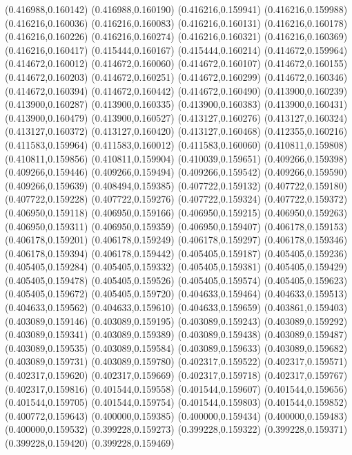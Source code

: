 (0.416988,0.160142)
(0.416988,0.160190)
(0.416216,0.159941)
(0.416216,0.159988)
(0.416216,0.160036)
(0.416216,0.160083)
(0.416216,0.160131)
(0.416216,0.160178)
(0.416216,0.160226)
(0.416216,0.160274)
(0.416216,0.160321)
(0.416216,0.160369)
(0.416216,0.160417)
(0.415444,0.160167)
(0.415444,0.160214)
(0.414672,0.159964)
(0.414672,0.160012)
(0.414672,0.160060)
(0.414672,0.160107)
(0.414672,0.160155)
(0.414672,0.160203)
(0.414672,0.160251)
(0.414672,0.160299)
(0.414672,0.160346)
(0.414672,0.160394)
(0.414672,0.160442)
(0.414672,0.160490)
(0.413900,0.160239)
(0.413900,0.160287)
(0.413900,0.160335)
(0.413900,0.160383)
(0.413900,0.160431)
(0.413900,0.160479)
(0.413900,0.160527)
(0.413127,0.160276)
(0.413127,0.160324)
(0.413127,0.160372)
(0.413127,0.160420)
(0.413127,0.160468)
(0.412355,0.160216)
(0.411583,0.159964)
(0.411583,0.160012)
(0.411583,0.160060)
(0.410811,0.159808)
(0.410811,0.159856)
(0.410811,0.159904)
(0.410039,0.159651)
(0.409266,0.159398)
(0.409266,0.159446)
(0.409266,0.159494)
(0.409266,0.159542)
(0.409266,0.159590)
(0.409266,0.159639)
(0.408494,0.159385)
(0.407722,0.159132)
(0.407722,0.159180)
(0.407722,0.159228)
(0.407722,0.159276)
(0.407722,0.159324)
(0.407722,0.159372)
(0.406950,0.159118)
(0.406950,0.159166)
(0.406950,0.159215)
(0.406950,0.159263)
(0.406950,0.159311)
(0.406950,0.159359)
(0.406950,0.159407)
(0.406178,0.159153)
(0.406178,0.159201)
(0.406178,0.159249)
(0.406178,0.159297)
(0.406178,0.159346)
(0.406178,0.159394)
(0.406178,0.159442)
(0.405405,0.159187)
(0.405405,0.159236)
(0.405405,0.159284)
(0.405405,0.159332)
(0.405405,0.159381)
(0.405405,0.159429)
(0.405405,0.159478)
(0.405405,0.159526)
(0.405405,0.159574)
(0.405405,0.159623)
(0.405405,0.159672)
(0.405405,0.159720)
(0.404633,0.159464)
(0.404633,0.159513)
(0.404633,0.159562)
(0.404633,0.159610)
(0.404633,0.159659)
(0.403861,0.159403)
(0.403089,0.159146)
(0.403089,0.159195)
(0.403089,0.159243)
(0.403089,0.159292)
(0.403089,0.159341)
(0.403089,0.159389)
(0.403089,0.159438)
(0.403089,0.159487)
(0.403089,0.159535)
(0.403089,0.159584)
(0.403089,0.159633)
(0.403089,0.159682)
(0.403089,0.159731)
(0.403089,0.159780)
(0.402317,0.159522)
(0.402317,0.159571)
(0.402317,0.159620)
(0.402317,0.159669)
(0.402317,0.159718)
(0.402317,0.159767)
(0.402317,0.159816)
(0.401544,0.159558)
(0.401544,0.159607)
(0.401544,0.159656)
(0.401544,0.159705)
(0.401544,0.159754)
(0.401544,0.159803)
(0.401544,0.159852)
(0.400772,0.159643)
(0.400000,0.159385)
(0.400000,0.159434)
(0.400000,0.159483)
(0.400000,0.159532)
(0.399228,0.159273)
(0.399228,0.159322)
(0.399228,0.159371)
(0.399228,0.159420)
(0.399228,0.159469)
